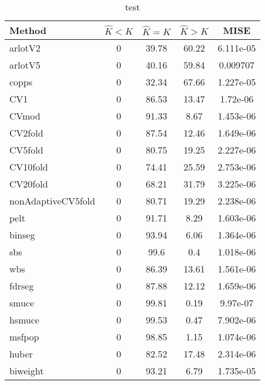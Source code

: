 \begin{table}[ht]
\centering
\begin{tabular}{l|cccc}
  \hline
Method & $\hat{K} < K$ & $\hat{K} = K$ & $\hat{K} > K$ & MISE \\ 
  \hline
arlotV2 &     0 & 39.78 & 60.22 & 6.111e-05 \\ 
  arlotV5 &     0 & 40.16 & 59.84 & 0.009707 \\ 
  copps &     0 & 32.34 & 67.66 & 1.227e-05 \\ 
  CV1 &     0 & 86.53 & 13.47 & 1.72e-06 \\ 
  CVmod &     0 & 91.33 &  8.67 & 1.453e-06 \\ 
  CV2fold &     0 & 87.54 & 12.46 & 1.649e-06 \\ 
  CV5fold &     0 & 80.75 & 19.25 & 2.227e-06 \\ 
  CV10fold &     0 & 74.41 & 25.59 & 2.753e-06 \\ 
  CV20fold &     0 & 68.21 & 31.79 & 3.225e-06 \\ 
  nonAdaptiveCV5fold &     0 & 80.71 & 19.29 & 2.238e-06 \\ 
  pelt &     0 & 91.71 &  8.29 & 1.603e-06 \\ 
  binseg &     0 & 93.94 &  6.06 & 1.364e-06 \\ 
  sbs &     0 &  99.6 &   0.4 & 1.018e-06 \\ 
  wbs &     0 & 86.39 & 13.61 & 1.561e-06 \\ 
  fdrseg &     0 & 87.88 & 12.12 & 1.659e-06 \\ 
  smuce &     0 & 99.81 &  0.19 & 9.97e-07 \\ 
  hsmuce &     0 & 99.53 &  0.47 & 7.902e-06 \\ 
  msfpop &     0 & 98.85 &  1.15 & 1.074e-06 \\ 
  huber &     0 & 82.52 & 17.48 & 2.314e-06 \\ 
  biweight &     0 & 93.21 &  6.79 & 1.735e-05 \\ 
   \hline
\end{tabular}
\caption{test} 
\end{table}
